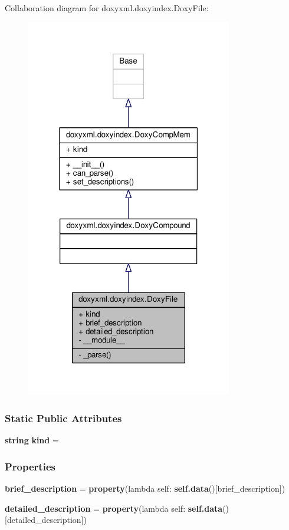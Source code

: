Collaboration diagram for doxyxml.\+doxyindex.\+Doxy\+File\+:
\nopagebreak
\begin{figure}[H]
\begin{center}
\leavevmode
\includegraphics[width=255pt]{d9/dda/classdoxyxml_1_1doxyindex_1_1DoxyFile__coll__graph}
\end{center}
\end{figure}
\subsubsection*{Static Public Attributes}
\begin{DoxyCompactItemize}
\item 
{\bf string} {\bf kind} = \textquotesingle{}
\end{DoxyCompactItemize}
\subsubsection*{Properties}
\begin{DoxyCompactItemize}
\item 
{\bf brief\+\_\+description} = {\bf property}(lambda self\+: {\bf self.\+data}()[\textquotesingle{}brief\+\_\+description\textquotesingle{}])
\item 
{\bf detailed\+\_\+description} = {\bf property}(lambda self\+: {\bf self.\+data}()[\textquotesingle{}detailed\+\_\+description\textquotesingle{}])
\end{DoxyCompactItemize}
